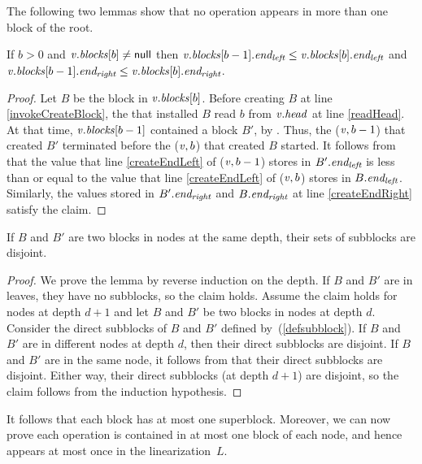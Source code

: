 The following two lemmas show that no operation appears in more than one block of the root.
\begin{lemma} \label{lem::headProgress}
 If $b>0$ and $\mbox{\textnormal{\textit{v}}}.\mbox{\textit{blocks}}[b] \neq \mbox{\sf null}$ then 
 $\mbox{\textnormal{\textit{v}}}.\mbox{\textit{blocks}}[b-1].\mbox{\textit{end\textsubscript{left}}} \leq \mbox{\textnormal{\textit{v}}}.\mbox{\textit{blocks}}[b].\mbox{\textit{end\textsubscript{left}}}$ and 
 $\mbox{\textnormal{\textit{v}}}.\mbox{\textit{blocks}}[b-1].\mbox{\textit{end\textsubscript{right}}} \leq \mbox{\textnormal{\textit{v}}}.\mbox{\textit{blocks}}[b].\mbox{\textit{end\textsubscript{right}}}$.
\end{lemma}
\begin{proof}
Let $B$ be the block in $\mbox{\textnormal{\textit{v}}}.\mbox{\textit{blocks}}[b]$.
Before creating $B$ at line \ref{invokeCreateBlock}, the  that installed $B$
read $b$ from $\mbox{\textnormal{\textit{v}}}.\mbox{\textit{head}}$ at line \ref{readHead}.
At that time, $\mbox{\textnormal{\textit{v}}}.\mbox{\textit{blocks}}[b-1]$ contained a block $B'$, by .
Thus, the ($\mbox{\textnormal{\textit{v}}},b-1$) that created $B'$ terminated before the ($\mbox{\textnormal{\textit{v}}},b$) that
created $B$ started.
It follows from  that the value that 
line \ref{createEndLeft} of ($\mbox{\textnormal{\textit{v}}},b-1$) stores in $B'.\mbox{\textit{end\textsubscript{left}}}$   
is less than or equal to the value that line \ref{createEndLeft} of ($\mbox{\textnormal{\textit{v}}},b$) 
stores in $B.\mbox{\textit{end\textsubscript{left}}}$.
Similarly, the values stored in $B'.\mbox{\textit{end\textsubscript{right}}}$ and $B.\mbox{\textit{end\textsubscript{right}}}$ at line \ref{createEndRight} 
satisfy the claim.
\end{proof}

\begin{lemma} \label{lem::subblocksDistinct}
If $B$ and $B'$ are two blocks in nodes at the same depth, their sets of subblocks are disjoint.
\end{lemma}
\begin{proof}
We prove the lemma by reverse induction on the depth.
If $B$ and $B'$ are in leaves, they have no subblocks, so the claim holds.
Assume the claim holds for nodes at depth $d+1$ and let $B$ and $B'$ be two blocks in nodes at depth $d$.
Consider the direct subblocks of $B$ and $B'$ defined by~(\ref{defsubblock}).
If $B$ and $B'$ are in different nodes at depth $d$, then their direct subblocks are disjoint.
If $B$ and $B'$ are in the same node, it follows from  that their direct subblocks are disjoint.
Either way, their direct subblocks (at depth $d+1$) are disjoint, so the claim follows from the induction hypothesis.
\end{proof}

It follows that each block has at most one superblock.
Moreover, we can now prove each operation is contained in at most one block of each node,
and hence appears at most once in the linearization~$L$.

